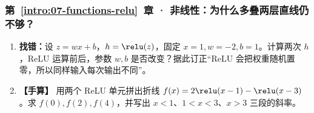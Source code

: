 \subsubsection*{第~\ref*{intro:07-functions-relu}~章 · 非线性：为什么多叠两层直线仍不够？}
\begin{enumerate}[label={},leftmargin=4.8em,itemsep=4pt]
\item[\textbf{C-012.}] \leavevmode{}\label{exercise:C-012}\label{exercise:relu-determinism}\textbf{找错：}设 $z=wx+b$，$h=\relu(z)$，固定 $x=1,w=-2,b=1$。计算两次 $h$，ReLU 运算前后，参数 $w,b$ 是否改变？据此订正“ReLU 会把权重随机置零，所以同样输入每次输出不同”。
\item[\textbf{C-013.}] \leavevmode{}\label{exercise:C-013}\label{exercise:relu-piecewise-slopes}\textbf{【手算】} 用两个 ReLU 单元拼出折线 $f(x)=2\relu(x-1)-\relu(x-3)$。求 $f(0),f(2),f(4)$，并写出 $x<1$、$1<x<3$、$x>3$ 三段的斜率。
\end{enumerate}
